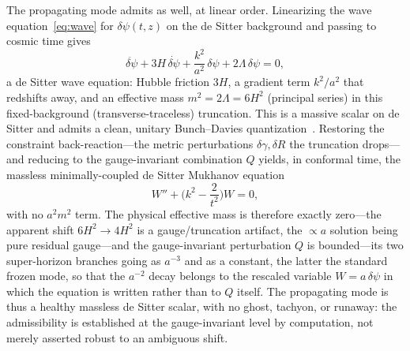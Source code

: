 \documentclass[11pt,a4paper]{article}
\theoremstyle{plain}
\theoremstyle{definition}
\theoremstyle{remark}
\begin{document}
The propagating mode admits as well, at linear order. Linearizing the wave equation~\eqref{eq:wave} for $\delta\psi(t,z)$ on the de Sitter background and passing to cosmic time gives
\begin{equation}
\ddot{\delta\psi}+3H\,\dot{\delta\psi}+\frac{k^2}{a^2}\,\delta\psi+2\Lambda\,\delta\psi=0,
\end{equation}
a de Sitter wave equation: Hubble friction $3H$, a gradient term $k^2/a^2$ that redshifts away, and an effective mass $m^2=2\Lambda=6H^2$ (principal series) in this fixed-background (transverse-traceless) truncation. This is a massive scalar on de Sitter and admits a clean, unitary Bunch--Davies quantization~\cite{BunchDavies1978}. Restoring the constraint back-reaction---the metric perturbations $\delta\gamma,\delta R$ the truncation drops---and reducing to the gauge-invariant combination $Q$ yields, in conformal time, the massless minimally-coupled de Sitter Mukhanov equation~\cite{MukhanovFeldmanBrandenberger1992}
\begin{equation}\label{eq:mukhanov}
W''+\Big(k^2-\frac{2}{t^2}\Big)W=0,
\end{equation}
with no $a^2m^2$ term. The physical effective mass is therefore exactly zero---the apparent shift $6H^2\!\to\!4H^2$ is a gauge/truncation artifact, the $\propto a$ solution being pure residual gauge---and the gauge-invariant perturbation $Q$ is bounded---its two super-horizon branches going as $a^{-3}$ and as a constant, the latter the standard frozen mode, so that the $a^{-2}$ decay belongs to the rescaled variable $W=a\,\delta\psi$ in which the equation is written rather than to $Q$ itself. The propagating mode is thus a healthy massless de Sitter scalar, with no ghost, tachyon, or runaway: the admissibility is established at the gauge-invariant level by computation, not merely asserted robust to an ambiguous shift.
\end{document}
